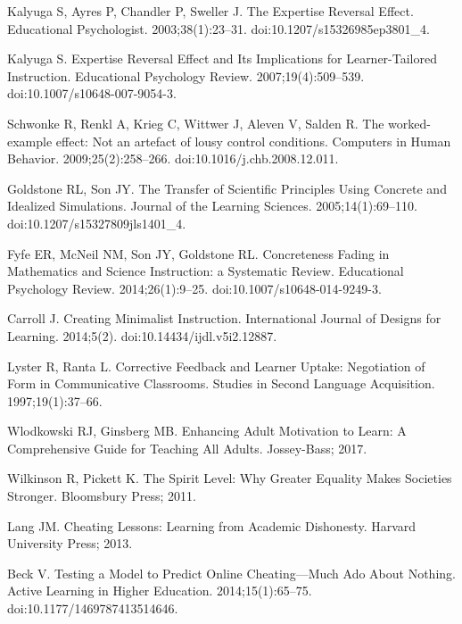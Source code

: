 \documentclass[10pt,letterpaper]{article}
\begin{document}
\begin{thebibliography}{10}
Kalyuga S, Ayres P, Chandler P, Sweller J.
\newblock The Expertise Reversal Effect.
\newblock Educational Psychologist. 2003;38(1):23--31.
\newblock doi:{10.1207/s15326985ep3801\_4}.

Kalyuga S.
\newblock Expertise Reversal Effect and Its Implications for Learner-Tailored
  Instruction.
\newblock Educational Psychology Review. 2007;19(4):509--539.
\newblock doi:{10.1007/s10648-007-9054-3}.

Schwonke R, Renkl A, Krieg C, Wittwer J, Aleven V, Salden R.
\newblock The worked-example effect: Not an artefact of lousy control
  conditions.
\newblock Computers in Human Behavior. 2009;25(2):258--266.
\newblock doi:{10.1016/j.chb.2008.12.011}.

Goldstone RL, Son JY.
\newblock The Transfer of Scientific Principles Using Concrete and Idealized
  Simulations.
\newblock Journal of the Learning Sciences. 2005;14(1):69--110.
\newblock doi:{10.1207/s15327809jls1401\_4}.

Fyfe ER, McNeil NM, Son JY, Goldstone RL.
\newblock Concreteness Fading in Mathematics and Science Instruction: a
  Systematic Review.
\newblock Educational Psychology Review. 2014;26(1):9--25.
\newblock doi:{10.1007/s10648-014-9249-3}.

Carroll J.
\newblock Creating Minimalist Instruction.
\newblock International Journal of Designs for Learning. 2014;5(2).
\newblock doi:{10.14434/ijdl.v5i2.12887}.

Lyster R, Ranta L.
\newblock Corrective Feedback and Learner Uptake: Negotiation of Form in
  Communicative Classrooms.
\newblock Studies in Second Language Acquisition. 1997;19(1):37--66.

Wlodkowski RJ, Ginsberg MB.
\newblock Enhancing Adult Motivation to Learn: A Comprehensive Guide for
  Teaching All Adults.
\newblock Jossey-Bass; 2017.

Wilkinson R, Pickett K.
\newblock The Spirit Level: Why Greater Equality Makes Societies Stronger.
\newblock Bloomsbury Press; 2011.

Lang JM.
\newblock Cheating Lessons: Learning from Academic Dishonesty.
\newblock Harvard University Press; 2013.

Beck V.
\newblock Testing a Model to Predict Online Cheating---Much Ado About Nothing.
\newblock Active Learning in Higher Education. 2014;15(1):65--75.
\newblock doi:{10.1177/1469787413514646}.


\end{thebibliography}
\end{document}
